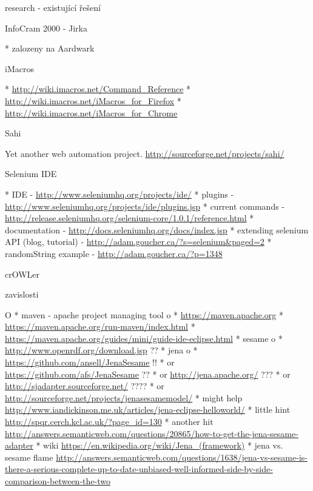 \chap research - existující řešení


\sec InfoCram 2000 - Jirka

\begitems
  * zalozeny na Aardwark 
\enditems


\sec iMacros

\begitems
  * \url{http://wiki.imacros.net/Command_Reference}
  * \url{http://wiki.imacros.net/iMacros_for_Firefox}
  * \url{http://wiki.imacros.net/iMacros_for_Chrome}
\enditems


\sec Sahi

Yet another web automation project. \url{http://sourceforge.net/projects/sahi/}


\sec Selenium IDE

\begitems
  * IDE - \url{http://www.seleniumhq.org/projects/ide/}
  * plugins - \url{http://www.seleniumhq.org/projects/ide/plugins.jsp}
  * current commands - \url{http://release.seleniumhq.org/selenium-core/1.0.1/reference.html}
  * documentation - \url{http://docs.seleniumhq.org/docs/index.jsp}
  * extending selenium API (blog, tutorial) - \url{http://adam.goucher.ca/?s=selenium&paged=2}
  \begitems
    * randomString example - \url{http://adam.goucher.ca/?p=1348}
  \enditems
\enditems






\chap crOWLer

\sec zavislosti

\begitems \style O
  * maven - apache project managing tool
  \begitems \style o
    * \url{https://maven.apache.org}
    * \url{https://maven.apache.org/run-maven/index.html}
    * \url{https://maven.apache.org/guides/mini/guide-ide-eclipse.html}
  \enditems
  * sesame
  \begitems \style o
    * \url{http://www.openrdf.org/download.jsp} ??
  \enditems
  * jena
  \begitems \style o
    * \url{https://github.com/ansell/JenaSesame} !!
    * or \url{https://github.com/afs/JenaSesame} ??
    * or \url{http://jena.apache.org/} ???
    * or \url{http://sjadapter.sourceforge.net/} ????
    * or \url{http://sourceforge.net/projects/jenasesamemodel/}
    * might help \url{http://www.iandickinson.me.uk/articles/jena-eclipse-helloworld/}
    * little hint \url{http://spqr.cerch.kcl.ac.uk/?page_id=130}
    * another hit \url{http://answers.semanticweb.com/questions/20865/how-to-get-the-jena-sesame-adapter}
    * wiki \url{https://en.wikipedia.org/wiki/Jena_(framework)}
    * jena vs. sesame flame \url{http://answers.semanticweb.com/questions/1638/jena-vs-sesame-is-there-a-serious-complete-up-to-date-unbiased-well-informed-side-by-side-comparison-between-the-two}
  \enditems
\enditems

